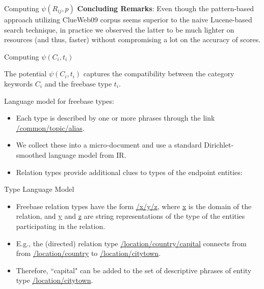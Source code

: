 \documentclass[pdf,11pt]{beamer}
\begin{document}
\begin{frame}{Computing $\psi(R_{ij},p)$}
\textbf{Concluding Remarks}: Even though the pattern-based approach utilizing ClueWeb09 corpus seems superior to the naive Lucene-based search technique, in practice we observed the latter to be much lighter on resources (and thus, faster) without compromising a lot on the accuracy of scores.

\end{frame}

\begin{frame}{Computing $\psi(C_i,t_i)$}
\begin{block}{}
The potential $\psi(C_i,t_i)$ captures the compatibility between the category keywords $C_i$ and the freebase type $t_i$.
\end{block}
Language model for freebase types:
\begin{itemize}
\item Each type is described by one or more phrases through the link \url{/common/topic/alias}.
\item  We collect these into a micro-document and use a standard Dirichlet-smoothed language model from IR.
\item Relation types provide additional clues to types of the endpoint entities:

\end{itemize}
  

\end{frame}

\begin{frame}{Type Language Model}
\begin{itemize}
\item Freebase relation types have the form \url{/x/y/z}, where \url{x} is the domain of the relation, and \url{y} and \url{z} are string representations of the type of the entities participating in the relation. 
\item E.g., the (directed) relation type \url{/location/country/capital} connects from from \url{/location/country} to \url{/location/citytown}.
\item Therefore, ``capital" can be added to the set of descriptive phrases of entity type \url{/location/citytown}.
\end{itemize}
\end{frame}
\end{document}
